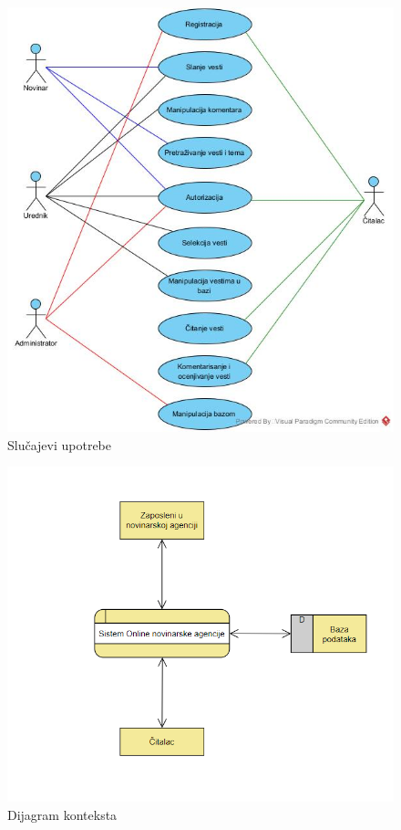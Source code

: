 \documentclass{article}
\begin{document}
\begin{figure}[htbp!]
\centering
\includegraphics[scale=0.7]{Slucajevi_upotrebe.jpg}
\caption{Slučajevi upotrebe}
\label{slk:dtp}
\end{figure}

\newpage

\begin{figure}[htbp!]
\centering
\includegraphics[scale=0.7]{Dijagram_konteksta.png}
\caption{Dijagram konteksta}
\label{slk:dtp}
\end{figure}
\end{document}
